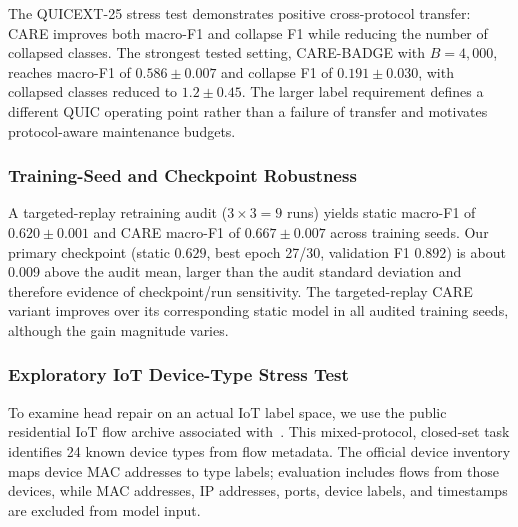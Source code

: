 \documentclass[journal]{IEEEtran}
\newcommand{\ours}{CARE}  %
\begin{document}
The QUICEXT-25 stress test demonstrates positive cross-protocol transfer: \ours{} improves both macro-F1 and collapse F1 while reducing the number of collapsed classes. The strongest tested setting, \ours{}-BADGE with $B{=}4{,}000$, reaches macro-F1 of $0.586{\pm}0.007$ and collapse F1 of $0.191{\pm}0.030$, with collapsed classes reduced to $1.2{\pm}0.45$. The larger label requirement defines a different QUIC operating point rather than a failure of transfer and motivates protocol-aware maintenance budgets.

\subsubsection{Training-Seed and Checkpoint Robustness}
\label{sec:checkpoint_robustness}

A targeted-replay retraining audit ($3{\times}3{=}9$ runs) yields static macro-F1 of $0.620{\pm}0.001$ and CARE macro-F1 of $0.667{\pm}0.007$ across training seeds.
Our primary checkpoint (static $0.629$, best epoch 27/30, validation F1 $0.892$) is about 0.009 above the audit mean, larger than the audit standard deviation and therefore evidence of checkpoint/run sensitivity. The targeted-replay CARE variant improves over its corresponding static model in all audited training seeds, although the gain magnitude varies.

\subsubsection{Exploratory IoT Device-Type Stress Test}
\label{sec:iot_homes}

To examine head repair on an actual IoT label space, we use the public residential IoT flow archive associated with~\cite{pashamokhtari2023dynamic}. This mixed-protocol, closed-set task identifies 24 known device types from flow metadata. The official device inventory maps device MAC addresses to type labels; evaluation includes flows from those devices, while MAC addresses, IP addresses, ports, device labels, and timestamps are excluded from model input.
\end{document}
